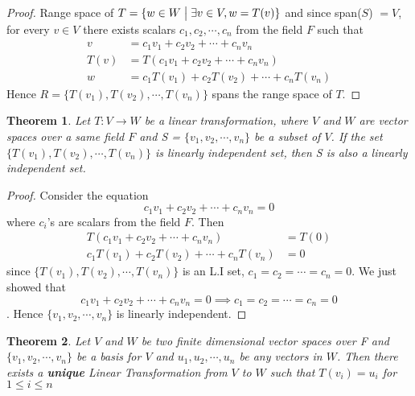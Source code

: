 \documentclass[a4paper, titlepage]{article}
\newtheorem{theorem}{Theorem}[section]
\begin{document}
        \begin{proof}
            Range space of $T = \{ w \in W\bigm\vert \exists v \in V, w = 
            T(v) \}$ and since span($S$) $= V$, for every $v 
            \in V$ there exists scalars $c_1, c_2, \cdots, c_n$ from 
            the field $F$ such that 
            \begin{align*}
                v    &= c_1v_1 + c_2v_2 + \cdots + c_nv_n \\
                T(v) &= T(c_1v_1 + c_2v_2 + \cdots + c_nv_n) \\
                w    &= c_1T(v_1) + c_2T(v_2) + \cdots + c_nT(v_n)
            \end{align*}
            Hence $R = \{ T(v_1), T(v_2), \cdots, T(v_n) \}$ spans the
            range space of $T$.
        \end{proof}
        \begin{theorem}
            Let $T: V \rightarrow W$ be a linear transformation, where
            $V$ and $W$ are vector spaces over a same field $F$ and S =
            $\{v_1, v_2, \cdots, v_n\}$ be a subset of $V$. If the
            set $\{T(v_1), T(v_2), \cdots, T(v_n)\}$ is linearly independent
            set, then S is also a linearly independent set.
        \end{theorem}
        \begin{proof}
            Consider the equation \[ c_1v_1 + c_2v_2 + \cdots + c_nv_n = 0 \]
            where $c_i$'s are scalars from the field $F$. Then 
            \begin{align*}
                T(c_1v_1 + c_2v_2 + \cdots + c_nv_n) &= T(0) \\
                c_1T(v_1) + c_2T(v_2) + \cdots + c_nT(v_n) &= 0 
            \end{align*}
            since $\{T(v_1), T(v_2), \cdots, T(v_n)\}$ is an L.I set,
            $c_1 = c_2 = \cdots = c_n = 0$. We just showed that 
            $$c_1v_1 + c_2v_2 + \cdots + c_nv_n = 0 \implies c_1 = c_2 = 
            \cdots = c_n = 0$$. Hence $\{ v_1, v_2, \cdots, v_n \}$ is
            linearly independent.
        \end{proof}
        \begin{theorem}
            Let $V$ and $W$ be two finite dimensional vector spaces over F
            and $\{ v_1, v_2, \cdots, v_n \}$ be a basis for $V$ and 
            $u_1, u_2, \cdots, u_n$ be any vectors in $W$. Then there 
            exists a \textbf{unique} Linear Transformation from $V$ to 
            $W$ such that $T(v_i) = u_i$ for $1 \le i \le n$
        \end{theorem}
\end{document}
